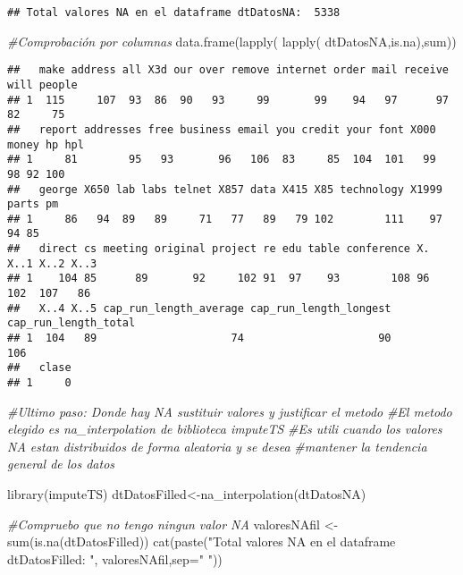 \documentclass[
]{article}
\newenvironment{Shaded}{\begin{snugshade}}{\end{snugshade}}
\newcommand{\AttributeTok}[1]{\textcolor[rgb]{0.77,0.63,0.00}{#1}}
\newcommand{\CommentTok}[1]{\textcolor[rgb]{0.56,0.35,0.01}{\textit{#1}}}
\newcommand{\FunctionTok}[1]{\textcolor[rgb]{0.00,0.00,0.00}{#1}}
\newcommand{\NormalTok}[1]{#1}
\newcommand{\OtherTok}[1]{\textcolor[rgb]{0.56,0.35,0.01}{#1}}
\newcommand{\StringTok}[1]{\textcolor[rgb]{0.31,0.60,0.02}{#1}}
\begin{document}
\begin{verbatim}
## Total valores NA en el dataframe dtDatosNA:  5338
\end{verbatim}

\begin{Shaded}
\begin{Highlighting}[]
  \CommentTok{\#Comprobación por columnas}
  \FunctionTok{data.frame}\NormalTok{(}\FunctionTok{lapply}\NormalTok{( }\FunctionTok{lapply}\NormalTok{( dtDatosNA,is.na),sum))}
\end{Highlighting}
\end{Shaded}

\begin{verbatim}
##   make address all X3d our over remove internet order mail receive will people
## 1  115     107  93  86  90   93     99       99    94   97      97   82     75
##   report addresses free business email you credit your font X000 money hp hpl
## 1     81        95   93       96   106  83     85  104  101   99    98 92 100
##   george X650 lab labs telnet X857 data X415 X85 technology X1999 parts pm
## 1     86   94  89   89     71   77   89   79 102        111    97    94 85
##   direct cs meeting original project re edu table conference X. X..1 X..2 X..3
## 1    104 85      89       92     102 91  97    93        108 96  102  107   86
##   X..4 X..5 cap_run_length_average cap_run_length_longest cap_run_length_total
## 1  104   89                     74                     90                  106
##   clase
## 1     0
\end{verbatim}

\begin{Shaded}
\begin{Highlighting}[]
  \CommentTok{\#Ultimo paso: Donde hay NA sustituir valores y justificar el metodo}
  \CommentTok{\#El metodo elegido es na\_interpolation de biblioteca imputeTS}
  \CommentTok{\#Es utili cuando los valores NA estan distribuidos de forma aleatoria y se desea}
  \CommentTok{\#mantener la tendencia general de los datos}

  \FunctionTok{library}\NormalTok{(imputeTS)}
\NormalTok{  dtDatosFilled}\OtherTok{\textless{}{-}}\FunctionTok{na\_interpolation}\NormalTok{(dtDatosNA)}

  \CommentTok{\#Compruebo que no tengo ningun valor NA}
\NormalTok{  valoresNAfil }\OtherTok{\textless{}{-}}\FunctionTok{sum}\NormalTok{(}\FunctionTok{is.na}\NormalTok{(dtDatosFilled))}
  \FunctionTok{cat}\NormalTok{(}\FunctionTok{paste}\NormalTok{(}\StringTok{"Total valores NA en el dataframe dtDatosFilled: "}\NormalTok{, valoresNAfil,}\AttributeTok{sep=}\StringTok{" "}\NormalTok{))}
\end{Highlighting}
\end{Shaded}
\end{document}
